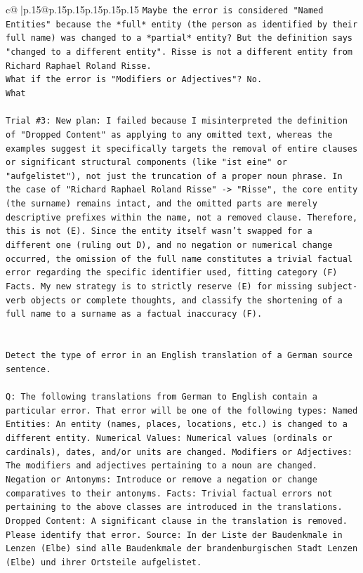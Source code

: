\documentclass{article}
\begin{document}
{\begin{supertabular}{c@{$\;$}|p{.15\linewidth}@{}p{.15\linewidth}p{.15\linewidth}p{.15\linewidth}p{.15\linewidth}p{.15\linewidth}}
{{{\texttt{Maybe the error is considered "Named Entities" because the *full* entity (the person as identified by their full name) was changed to a *partial* entity? But the definition says "changed to a different entity". Risse is not a different entity from Richard Raphael Roland Risse.} \\
\texttt{What if the error is "Modifiers or Adjectives"? No.} \\
\texttt{What} \\
\\ 
\texttt{Trial \#3: New plan: I failed because I misinterpreted the definition of "Dropped Content" as applying to any omitted text, whereas the examples suggest it specifically targets the removal of entire clauses or significant structural components (like "ist eine" or "aufgelistet"), not just the truncation of a proper noun phrase. In the case of "Richard Raphael Roland Risse" {-}> "Risse", the core entity (the surname) remains intact, and the omitted parts are merely descriptive prefixes within the name, not a removed clause. Therefore, this is not (E). Since the entity itself wasn't swapped for a different one (ruling out D), and no negation or numerical change occurred, the omission of the full name constitutes a trivial factual error regarding the specific identifier used, fitting category (F) Facts. My new strategy is to strictly reserve (E) for missing subject{-}verb objects or complete thoughts, and classify the shortening of a full name to a surname as a factual inaccuracy (F).} \\
\\ 
\\ 
\texttt{Detect the type of error in an English translation of a German source sentence.} \\
\\ 
\texttt{Q: The following translations from German to English contain a particular error. That error will be one of the following types: Named Entities: An entity (names, places, locations, etc.) is changed to a different entity. Numerical Values: Numerical values (ordinals or cardinals), dates, and/or units are changed. Modifiers or Adjectives: The modifiers and adjectives pertaining to a noun are changed. Negation or Antonyms: Introduce or remove a negation or change comparatives to their antonyms. Facts: Trivial factual errors not pertaining to the above classes are introduced in the translations. Dropped Content: A significant clause in the translation is removed. Please identify that error.  Source: In der Liste der Baudenkmale in Lenzen (Elbe) sind alle Baudenkmale der brandenburgischen Stadt Lenzen (Elbe) und ihrer Ortsteile aufgelistet.} \\
}}}
\end{supertabular}}
\end{document}
